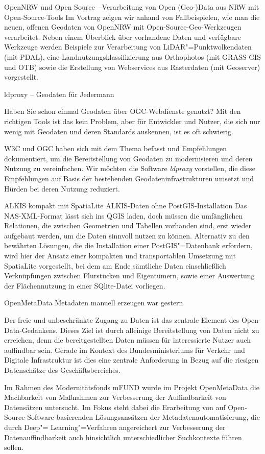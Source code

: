 %
{OpenNRW und Open Source~--\linebreak Verarbeitung von Open (Geo-)Data aus NRW mit Open-Source-Tools}%
{}%
{
Im Vortrag zeigen wir anhand von Fallbeispielen, wie man die neuen, offenen Geodaten von OpenNRW mit
Open-Source-Geo-Werkzeugen verarbeitet. Neben einem Überblick über
vorhandene Daten und verfügbare Werkzeuge werden Beispiele zur Verarbeitung von
LiDAR"=Punktwolkendaten (mit PDAL), eine Landnutzungsklassifizierung aus Orthophotos (mit GRASS GIS
und OTB) sowie die Erstellung von Webservices aus Rasterdaten (mit Geoserver) vorgestellt.%
}



%
{ldproxy -- Geodaten für Jedermann}%
{}%
{
Haben Sie schon einmal Geodaten über OGC-Webdienste genutzt? Mit den richtigen Tools ist das kein Problem,
aber für Entwickler und Nutzer, die sich nur wenig mit Geodaten und deren Standards auskennen, ist
es oft schwierig.

W3C und OGC haben sich mit dem Thema befasst und Empfehlungen dokumentiert, um
die Bereitstellung von Geodaten zu modernisieren und deren Nutzung zu vereinfachen. Wir möchten die
Software \emph{ldproxy} vorstellen, die diese Empfehlungen auf Basis der bestehenden
Geodateninfrastrukturen umsetzt und Hürden bei deren Nutzung reduziert.%
}

%
{ALKIS kompakt mit SpatiaLite}%
{ALKIS-Daten ohne PostGIS-Installation}%
{
Das NAS-XML-Format lässt sich ins QGIS laden, doch müssen die umfänglichen Relationen, die zwischen
Geometrien und Tabellen vorhanden sind, erst wieder aufgebaut werden, um die Daten sinnvoll
nutzen zu können.
Alternativ zu den bewährten Lösungen, die die Installation einer PostGIS"=Datenbank
erfordern, wird hier der Ansatz einer kompakten und transportablen Umsetzung mit SpatiaLite
vorgestellt, bei dem am Ende sämtliche Daten einschließlich Verknüpfungen zwischen Flurstücken und
Ei\-gen\-tü\-mern, sowie einer Auswertung der Flä\-chen\-nut\-zung in einer SQlite-Datei vorliegen.%
}

%
{OpenMetaData}%
{Metadaten manuell erzeugen war gestern}%
{
Der freie und unbeschränkte Zugang zu Daten ist das zentrale Element des Open-Data-Gedankens. Dieses
Ziel ist durch alleinige Bereitstellung von Daten nicht zu erreichen, denn die bereitgestellten
Daten müssen für interessierte Nutzer auch auffindbar sein. Gerade im Kontext des Bundesministeriums
für Verkehr und Digitale Infrastruktur ist dies eine zentrale Anforderung in Bezug auf die riesigen
Datenschätze des Geschäftsbereiches.

Im Rahmen des Modernitätsfonds mFUND wurde im Projekt OpenMetaData die Machbarkeit von Maßnahmen zur
Verbesserung der Auffindbarkeit von Datensätzen untersucht. Im Fokus steht dabei die Erarbeitung von
auf Open-Source-Software basierenden Lösungsansätzen der Metadatenautomatisierung, die durch Deep"=
Learning"=Verfahren angereichert zur Verbesserung der Datenauffindbarkeit auch hinsichtlich
unterschiedlicher Suchkontexte führen sollen.
}


